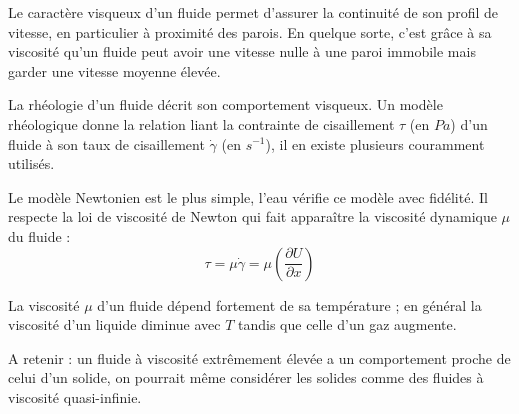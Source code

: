 Le caractère visqueux d'un fluide permet d'assurer la continuité de son profil de vitesse, en particulier à proximité des parois. En quelque sorte, c'est grâce à sa viscosité qu'un fluide peut avoir une vitesse nulle à une paroi immobile mais garder une vitesse moyenne élevée.

La rhéologie d'un fluide décrit son comportement visqueux. Un modèle rhéologique donne la relation liant la contrainte de cisaillement $\tau$ (en $Pa$) d'un fluide à son taux de cisaillement $\dot{\gamma}$ (en $s^{-1}$), il en existe plusieurs couramment utilisés.

Le modèle Newtonien est le plus simple, l'eau vérifie ce modèle avec fidélité. Il respecte la loi de viscosité de Newton qui fait apparaître la viscosité dynamique $\mu$ du fluide :
%
\begin{equation}
\tau = \mu \dot{\gamma} = \mu \left( \frac{\partial U}{\partial x} \right)
\end{equation}

La viscosité $\mu$ d'un fluide dépend fortement de sa température ; en général la viscosité d'un liquide diminue avec $T$ tandis que celle d'un gaz augmente.

A retenir : un fluide à viscosité extrêmement élevée a un comportement proche de celui d'un solide, on pourrait même considérer les solides comme des fluides à viscosité quasi-infinie.